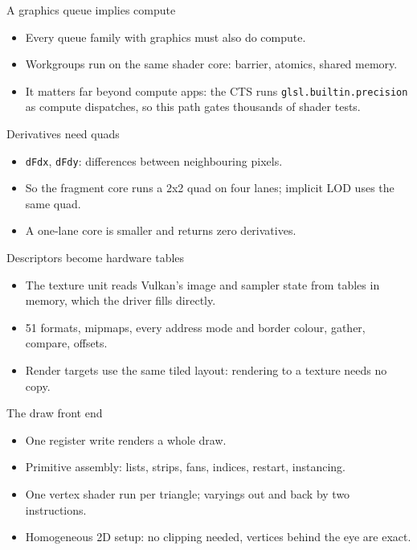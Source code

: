 \documentclass[aspectratio=169,11pt]{beamer}
\begin{document}
\begin{frame}{A graphics queue implies compute}
  \begin{itemize}
    \item Every queue family with graphics must also do compute.
    \item Workgroups run on the same shader core: barrier, atomics, shared memory.
    \item It matters far beyond compute apps: the CTS runs \texttt{glsl.builtin.precision} as compute
      dispatches, so this path gates thousands of shader tests.
  \end{itemize}
\end{frame}

\begin{frame}{Derivatives need quads}
  \begin{itemize}
    \item \texttt{dFdx}, \texttt{dFdy}: differences between neighbouring pixels.
    \item So the fragment core runs a 2x2 quad on four lanes; implicit LOD uses the same quad.
    \item A one-lane core is smaller and returns zero derivatives.
  \end{itemize}
\end{frame}

\begin{frame}{Descriptors become hardware tables}
  \begin{itemize}
    \item The texture unit reads Vulkan's image and sampler state from tables in memory, which the
      driver fills directly.
    \item 51 formats, mipmaps, every address mode and border colour, gather, compare, offsets.
    \item Render targets use the same tiled layout: rendering to a texture needs no copy.
  \end{itemize}
\end{frame}

\begin{frame}{The draw front end}
  \begin{itemize}
    \item One register write renders a whole draw.
    \item Primitive assembly: lists, strips, fans, indices, restart, instancing.
    \item One vertex shader run per triangle; varyings out and back by two instructions.
    \item Homogeneous 2D setup: no clipping needed, vertices behind the eye are exact.
  \end{itemize}
\end{frame}
\end{document}
